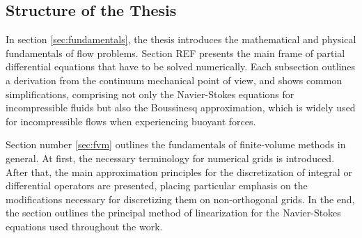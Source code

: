\subsection{Structure of the Thesis}

In section \ref{sec:fundamentals}, the thesis introduces the mathematical and physical fundamentals of flow problems. Section REF presents the main frame of partial differential equations that have to be solved numerically. Each subsection outlines a derivation from the continuum mechanical point of view, and shows common simplifications, comprising not only the Navier-Stokes equations for incompressible fluids but also the Boussinesq approximation, which is widely used for incompressible flows when experiencing buoyant forces.

Section number \ref{sec:fvm} outlines the fundamentals of finite-volume methods in general. At first, the necessary terminology for numerical grids is introduced. After that, the main approximation principles for the discretization of integral or differential operators are presented, placing particular emphasis on the modifications necessary for discretizing them on non-orthogonal grids. In the end, the section outlines the principal method of linearization for the Navier-Stokes equations used throughout the work.

